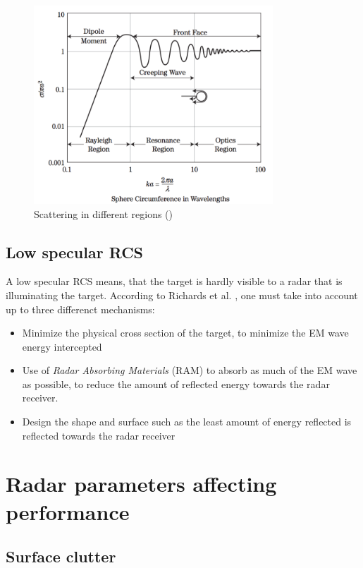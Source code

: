 \begin{figure}[h!]
	\centering
	\includegraphics[width=0.8\textwidth]{images/nRCS}
	\caption{Scattering in different regions	 (\citep[c.f.][Fig. 6-12]{richards2010principles})}
	\label{fig:RCS}
\end{figure}

\subsection{Low specular RCS}
A low specular RCS means, that the target is hardly visible to a radar that is illuminating the target. According to Richards et al. \citep{richards2010principles}, one must take into account up to three differenct mechanisms:
\begin{itemize}
	\item Minimize the physical cross section of the target, to minimize the EM wave energy intercepted
	\item Use of \textit{Radar Absorbing Materials} (RAM) to absorb as much of the EM wave as possible, to reduce the amount of reflected energy towards the radar receiver.
	\item Design the shape and surface such as the least amount of energy reflected is reflected towards the radar receiver
\end{itemize}


\section{Radar parameters affecting performance}

\subsection{Surface clutter}
\label{sec:surfaceClutter}


